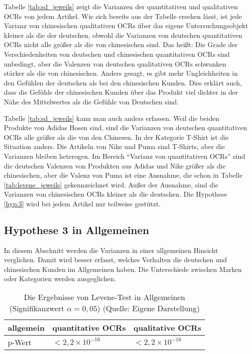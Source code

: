 Tabelle \ref{tab:sd_jeweils} zeigt die Varianzen der quantitativen und qualitativen \ac{OCRs} von jedem Artikel. Wie sich bereits aus der Tabelle ersehen lässt, ist jede Varianz von chinesischen qualitativen \ac{OCRs} über das eigene Untersuchungsobjekt kleiner als die der deutschen, obwohl die Varianzen von deutschen quantitativen \ac{OCRs} nicht alle größer als die von chinesischen sind. Das heißt: Die Grade der Verschiedenheiten von deutschen und chinesischen quantitativen \ac{OCRs} sind unbedingt, aber die Valenzen von deutschen qualitativen \ac{OCRs} schwanken stärker als die von chinesischen. Anders gesagt, es gibt mehr Ungleichheiten in den Gefühlen der deutschen als bei den chinesischen Kunden. Dies erklärt auch, dass die Gefühle der chinesischen Kunden über das Produkt viel dichter in der Nähe des Mittelwertes als die Gefühle von Deutschen sind.

Tabelle \ref{tab:sd_jeweils} kann man auch anders erfassen. Weil die beiden Produkte von Adidas Hosen sind, sind die Varianzen von deutschen quantitativen \ac{OCRs} alle größer als die von den Chinesen. In der Kategorie T-Shirt ist die Situation anders. Die Artikeln von Nike und Puma sind T-Shirts, aber die Varianzen bleiben heterogen. Im Bereich ``Varianz von quantitativen \ac{OCRs}'' sind die deutschen Valenzen von Produkten aus Adidas und Nike größer als die chinesischen, aber die Valenz von Puma ist eine Ausnahme, die schon in Tabelle \ref{tab:levene_jeweils} gekennzeichnet wird. Außer der Ausnahme, sind die Varianzen von chinesischen \ac{OCRs} kleiner als die deutschen. Die Hypothese \ref{hyp:3} wird bei jedem Artikel nur teilweise gestützt. 
\subsection{Hypothese 3 in Allgemeinen}
In diesem Abschnitt werden die Varianzen in einer allgemeinen Hinsicht verglichen. Damit wird besser erfasst, welches Verhalten die deutschen und chinesischen Kunden im Allgemeinen haben. Die Unterschiede zwischen Marken oder Kategorien werden ausgeglichen.

\begin{table}[htb]
\centering
\begin{tabular}{|l|l|l|}
\hline
allgemein & quantitative \ac{OCRs} & qualitative \ac{OCRs}  \\ \hline
p-Wert    & $< 2,2 \times 10^{-16}$ & $< 2,2 \times 10^{-16}$  \\ \hline
\end{tabular}
\caption[Die Ergebnisse von Levene-Test in Allgemeinen]{Die Ergebnisse von Levene-Test in Allgemeinen (Signifikanzwert $\alpha = 0,05$) (Quelle: Eigene Darstellung)}
\label{tab:levene_allgemein}
\end{table}

